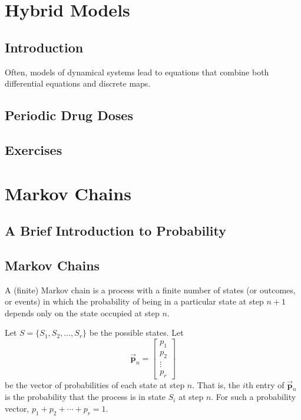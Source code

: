 \documentclass{book}
\newcommand{\BP}{\vec{\textbf{p}}}
\begin{document}
\chapter{Hybrid Models}
\section{Introduction}
Often, models of dynamical systems lead to equations that combine
both differential equations and discrete maps.
\section{Periodic Drug Doses}
\section{Exercises}
%
%
%
\chapter{Markov Chains}
\section{A Brief Introduction to Probability}
\section{Markov Chains}

A (finite) Markov chain is a process with a finite
number of states (or outcomes, or events) in which
the probability of being in a particular state
at step $n+1$ depends only on the state occupied
at step $n$.

Let $S = \{S_1,S_2,\ldots,S_r\}$ be the possible states.
Let
\begin{equation}
   \BP_n = \begin{bmatrix}
               p_1 \\ p_2 \\ \vdots \\ p_r
           \end{bmatrix}
\end{equation}
be the vector  of probabilities of each state
at step $n$. That is, the $i$th entry of $\BP_n$
is the probability that the process is in
state $S_i$ at step $n$.
For such a probability vector, $p_1+p_2+\cdots+p_r = 1$.
\end{document}
